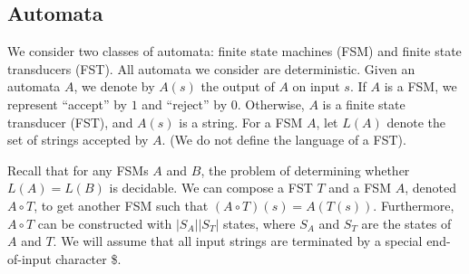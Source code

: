 \documentclass{llncs}
\begin{document}
    \vspace{-0.1in}
  \subsection{Automata}
    We consider two classes of automata: finite state machines (FSM) and finite
    state transducers (FST). All automata we consider are deterministic. Given an
    automata $A$, we denote by $A(s)$ the output of $A$ on input $s$. If $A$ is a
    FSM, we represent ``accept'' by $1$ and ``reject'' by $0$. Otherwise, $A$ is a
    finite state transducer (FST), and $A(s)$ is a string. For a FSM $A$, let $L(A)$
    denote the set of strings accepted by $A$. (We do not define the language of a
    FST).

    Recall that for any FSMs $A$ and $B$, the problem of determining whether $L(A) =
    L(B)$ is decidable. We can compose a FST $T$ and a FSM $A$, denoted $A \circ T$,
    to get another FSM such that $(A\circ T)(s) = A(T(s))$.
    Furthermore, $A\circ T$ can be constructed with $|S_A||S_T|$ states,
    where $S_A$ and $S_T$ are the states of $A$ and $T$.
    We will assume that all input strings are terminated by a special end-of-input character \$.

%
%


\end{document}
